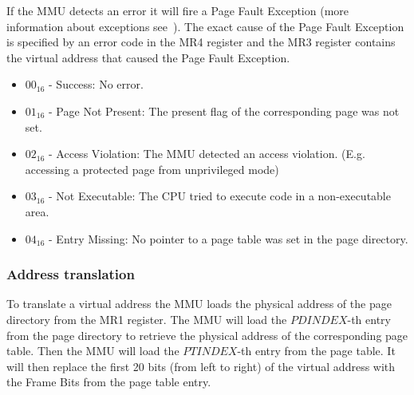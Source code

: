 If the MMU detects an error it will fire a Page Fault Exception (more information about exceptions see~). The exact cause
of the Page Fault Exception is specified by an error code in the MR4 register and the MR3 register contains the virtual address that caused the Page Fault Exception. 


\begin{itemize}
  \item $00_{16}$ - Success: No error.
  \item $01_{16}$ - Page Not Present: The present flag of the corresponding page was not set.
  \item $02_{16}$ - Access Violation: The MMU detected an access violation. (E.g. accessing a protected page from unprivileged mode)
  \item $03_{16}$ - Not Executable: The CPU tried to execute code in a non-executable area.
  \item $04_{16}$ - Entry Missing: No pointer to a page table was set in the page directory.
\end{itemize}


\subsubsection{Address translation}

To translate a virtual address the MMU loads the physical address of the page directory from the MR1 register. The MMU will
load the $PDINDEX$-th entry from the page directory to retrieve the physical address of the corresponding page table. Then the MMU will
load the $PTINDEX$-th entry from the page table. It will then replace the first 20 bits (from left to right) of the virtual address with the
Frame Bits from the page table entry.  
